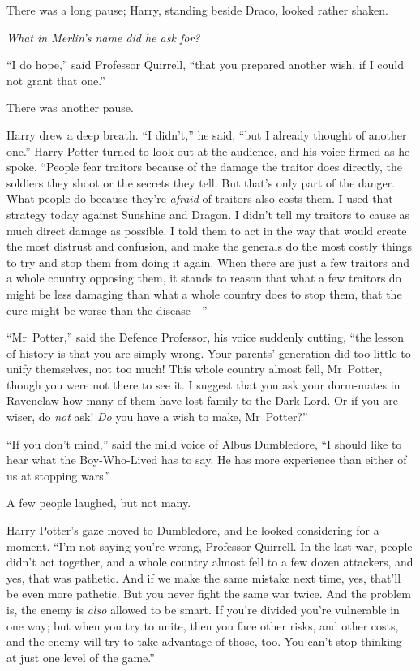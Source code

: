 There was a long pause; Harry, standing beside Draco, looked rather shaken.

\emph{What in Merlin’s name did he ask for?}

“I do hope,” said Professor Quirrell, “that you prepared another wish, if I
could not grant that one.”

There was another pause.

Harry drew a deep breath. “I didn’t,” he said, “but I already thought of
another one.” Harry Potter turned to look out at the audience, and his voice
firmed as he spoke. “People fear traitors because of the damage the traitor
does directly, the soldiers they shoot or the secrets they tell. But that’s
only part of the danger. What people do because they’re \emph{afraid} of
traitors also costs them. I used that strategy today against Sunshine and
Dragon. I didn’t tell my traitors to cause as much direct damage as possible. I
told them to act in the way that would create the most distrust and confusion,
and make the generals do the most costly things to try and stop them from doing
it again. When there are just a few traitors and a whole country opposing them,
it stands to reason that what a few traitors do might be less damaging than
what a whole country does to stop them, that the cure might be worse than the
disease—”

“Mr~Potter,” said the Defence Professor, his voice suddenly cutting, “the
lesson of history is that you are simply wrong. Your parents’ generation did
too little to unify themselves, not too much! This whole country almost fell,
Mr~Potter, though you were not there to see it. I suggest that you ask your
dorm-mates in Ravenclaw how many of them have lost family to the Dark Lord. Or
if you are wiser, do \emph{not} ask! \emph{Do} you have a wish to make,
Mr~Potter?”

“If you don’t mind,” said the mild voice of Albus Dumbledore, “I should like to
hear what the Boy-Who-Lived has to say. He has more experience than either of
us at stopping wars.”

A few people laughed, but not many.

Harry Potter’s gaze moved to Dumbledore, and he looked considering for a
moment. “I’m not saying you’re wrong, Professor Quirrell. In the last war,
people didn’t act together, and a whole country almost fell to a few dozen
attackers, and yes, that was pathetic. And if we make the same mistake next
time, yes, that’ll be even more pathetic. But you never fight the same war
twice. And the problem is, the enemy is \emph{also} allowed to be smart. If
you’re divided you’re vulnerable in one way; but when you try to unite, then
you face other risks, and other costs, and the enemy will try to take advantage
of those, too. You can’t stop thinking at just one level of the game.”

